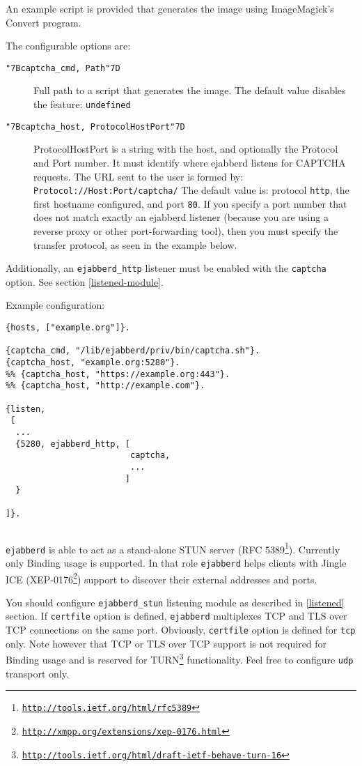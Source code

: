 \documentclass[a4paper,10pt]{book}
\newcommand{\ind}[1]{\begin{latexonly}\index{#1}\end{latexonly}}
\newcommand{\makesubsection}[2]{ \aname{#1}{} \subsection{\ahrefloc{#1}{#2}} \label{#1} }
\newcommand{\bracehack}{\def\{{\char"7B}\def\}{\char"7D}}
\newcommand{\titem}[1]{\item[\bracehack\texttt{#1}]}
\newcommand{\option}[1]{\texttt{#1}}
\newcommand{\term}[1]{\texttt{#1}}
\newcommand{\ejabberd}{\texttt{ejabberd}}
\gdef\footahref#1#2{#2\footnote{\href{#1}{\texttt{#1}}}}
\newcommand{\txepref}[2]{\footahref{http://xmpp.org/extensions/xep-#1.html}{#2}}
\newcommand{\xepref}[1]{\txepref{#1}{XEP-#1}}
\begin{document}
An example script is provided that generates the image
using ImageMagick's Convert program.

The configurable options are:
\begin{description}
  \titem{\{captcha\_cmd, Path\}} 
  Full path to a script that generates the image.
  The default value disables the feature: \term{undefined}
  \titem{\{captcha\_host, ProtocolHostPort\}} 
  ProtocolHostPort is a string with the host, and optionally the Protocol and Port number.
  It must identify where ejabberd listens for CAPTCHA requests.
  The URL sent to the user is formed by: \term{Protocol://Host:Port/captcha/}
  The default value is: protocol \term{http}, the first hostname configured, and port \term{80}.
  If you specify a port number that does not match exactly an ejabberd listener
  (because you are using a reverse proxy or other port-forwarding tool),
  then you must specify the transfer protocol, as seen in the example below.
\end{description}

Additionally, an \term{ejabberd\_http} listener must be enabled with the \term{captcha} option.
See section \ref{listened-module}.

Example configuration:
\begin{verbatim}
{hosts, ["example.org"]}.

{captcha_cmd, "/lib/ejabberd/priv/bin/captcha.sh"}.
{captcha_host, "example.org:5280"}.
%% {captcha_host, "https://example.org:443"}.
%% {captcha_host, "http://example.com"}.

{listen,
 [
  ...
  {5280, ejabberd_http, [
                         captcha,
                         ...
                        ]
  }

]}.
\end{verbatim}

\makesubsection{stun}{STUN}
\ind{options!stun}\ind{stun}

\ejabberd{} is able to act as a stand-alone STUN server
(\footahref{http://tools.ietf.org/html/rfc5389}{RFC 5389}). Currently only Binding usage
is supported. In that role \ejabberd{} helps clients with Jingle ICE (\xepref{0176}) support to discover their external addresses and ports.

You should configure \term{ejabberd\_stun} listening module as described in \ref{listened} section.
If \option{certfile} option is defined, \ejabberd{} multiplexes TCP and
TLS over TCP connections on the same port. Obviously, \option{certfile} option
is defined for \term{tcp} only. Note however that TCP or TLS over TCP
support is not required for Binding usage and is reserved for
\footahref{http://tools.ietf.org/html/draft-ietf-behave-turn-16}{TURN}
functionality. Feel free to configure \term{udp} transport only.
\end{document}
